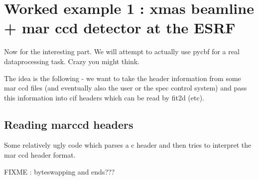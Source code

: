 \documentclass[10pt,a4paper,twoside,notitlepage]{article}
\begin{document}
\section{Worked example 1 : xmas beamline + mar ccd detector at the ESRF}

Now for the interesting part. We will attempt to actually use pycbf for a real
dataprocessing task. Crazy you might think.

The idea is the following - we want to take the header information from some 
mar ccd files (and eventually also the user or the spec control system) and
pass this information into cif headers which can be read by fit2d (etc).

\subsection{Reading marccd headers}

Some relatively ugly code which parses a c header and then tries to interpret
the mar ccd header format. 

FIXME : byteswapping and ends???
\end{document}
